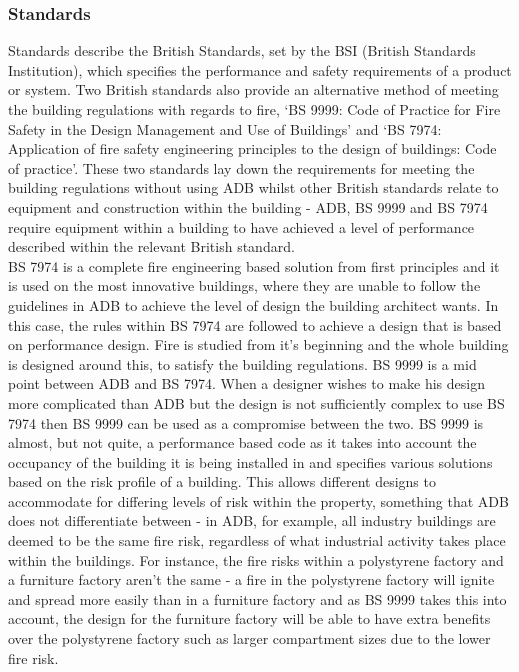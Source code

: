 \documentclass[table,a4paper,oneside]{book}
\begin{document}
\subsubsection{Standards}
Standards describe the British Standards, set by the BSI (British Standards Institution), which specifies the performance and safety requirements of a product or system. Two British standards also provide an alternative method of meeting the building regulations with regards to fire,  `BS 9999: Code of Practice for Fire Safety in the Design Management and Use of Buildings' and `BS 7974: Application of fire safety engineering principles to the design of buildings: Code of practice'. These two standards lay down the requirements for meeting the building regulations without using ADB whilst other British standards relate to equipment and construction within the building - ADB, BS 9999 and BS 7974 require equipment within a building to have achieved a level of performance described within the relevant British standard.
\\
BS 7974 is a complete fire engineering based solution from first principles and it is used on the most innovative buildings, where they are unable to follow the guidelines in ADB to achieve the level of design the building architect wants. In this case, the rules within BS 7974 are followed to achieve a design that is based on performance design. Fire is studied from it's beginning and the whole building is designed around this, to satisfy the building regulations.
BS 9999 is a mid point between ADB and BS 7974. When a designer wishes to make his design more complicated than ADB but the design is not sufficiently complex to use BS 7974 then BS 9999 can be used as a compromise between the two. BS 9999 is almost, but not quite, a performance based code as it takes into account the occupancy of the building it is being installed in and specifies various solutions based on the risk profile of a building. This allows different designs to accommodate for differing levels of risk within the property, something that ADB does not differentiate between - in ADB, for example, all industry buildings are deemed to be the same fire risk, regardless of what industrial activity takes place within the buildings.  For instance, the fire risks within a polystyrene factory and a furniture factory aren't the same - a fire in the polystyrene factory will ignite and spread more easily than in a furniture factory and as BS 9999 takes this into account, the design for the furniture factory will be able to have extra benefits over the polystyrene factory such as larger compartment sizes due to the lower fire risk.
\end{document}
